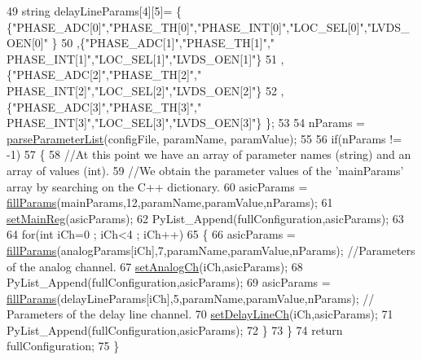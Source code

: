 \begin{DoxyCode}
49     \textcolor{keywordtype}{string} delayLineParams[4][5]= \{ \{\textcolor{stringliteral}{"PHASE\_ADC[0]"},\textcolor{stringliteral}{"PHASE\_TH[0]"},\textcolor{stringliteral}{"PHASE\_INT[0]"},\textcolor{stringliteral}{"LOC\_SEL[0]"},\textcolor{stringliteral}{"LVDS\_OEN[0]"}
      \}
50                                                                 ,\{\textcolor{stringliteral}{"PHASE\_ADC[1]"},\textcolor{stringliteral}{"PHASE\_TH[1]"},\textcolor{stringliteral}{"
      PHASE\_INT[1]"},\textcolor{stringliteral}{"LOC\_SEL[1]"},\textcolor{stringliteral}{"LVDS\_OEN[1]"}\}
51                                                                 ,\{\textcolor{stringliteral}{"PHASE\_ADC[2]"},\textcolor{stringliteral}{"PHASE\_TH[2]"},\textcolor{stringliteral}{"
      PHASE\_INT[2]"},\textcolor{stringliteral}{"LOC\_SEL[2]"},\textcolor{stringliteral}{"LVDS\_OEN[2]"}\}
52                                                                 ,\{\textcolor{stringliteral}{"PHASE\_ADC[3]"},\textcolor{stringliteral}{"PHASE\_TH[3]"},\textcolor{stringliteral}{"
      PHASE\_INT[3]"},\textcolor{stringliteral}{"LOC\_SEL[3]"},\textcolor{stringliteral}{"LVDS\_OEN[3]"}\}               \};
53 
54     nParams = \hyperlink{classICECALv3_a313e8166af1ce26b4026f883ad900fb9}{parseParameterList}(configFile, paramName, paramValue);
55 
56     \textcolor{keywordflow}{if}(nParams != -1)
57     \{
58         \textcolor{comment}{//At this point we have an array of parameter names (string) and an array of values (int).}
59         \textcolor{comment}{//We obtain the parameter values of the 'mainParams' array by searching on the C++ dictionary.}
60         asicParams = \hyperlink{classICECALv3_ac006abc42a048308427f6801d783a407}{fillParams}(mainParams,12,paramName,paramValue,nParams);
61         \hyperlink{classICECALv3_a479f7e17669da4b785af840049d39cb4}{setMainReg}(asicParams);
62         PyList\_Append(fullConfiguration,asicParams);
63 
64         \textcolor{keywordflow}{for}(\textcolor{keywordtype}{int} iCh=0 ; iCh<4 ; iCh++)
65         \{
66             asicParams = \hyperlink{classICECALv3_ac006abc42a048308427f6801d783a407}{fillParams}(analogParams[iCh],7,paramName,paramValue,nParams);            \textcolor{comment}{
      //Parameters of the analog channel.}
67             \hyperlink{classICECALv3_a9578e4d13c250d8bc417f68c79d6a21d}{setAnalogCh}(iCh,asicParams);
68             PyList\_Append(fullConfiguration,asicParams);
69             asicParams = \hyperlink{classICECALv3_ac006abc42a048308427f6801d783a407}{fillParams}(delayLineParams[iCh],5,paramName,paramValue,nParams);     \textcolor{comment}{//
      Parameters of the delay line channel.}
70             \hyperlink{classICECALv3_a14a7a29c9a3412c062f053cc616b860a}{setDelayLineCh}(iCh,asicParams);       
71             PyList\_Append(fullConfiguration,asicParams);
72         \}
73     \}
74     \textcolor{keywordflow}{return} fullConfiguration;
75 \}
\end{DoxyCode}
\mbox{\label{classICECALv3_a313e8166af1ce26b4026f883ad900fb9}} 
